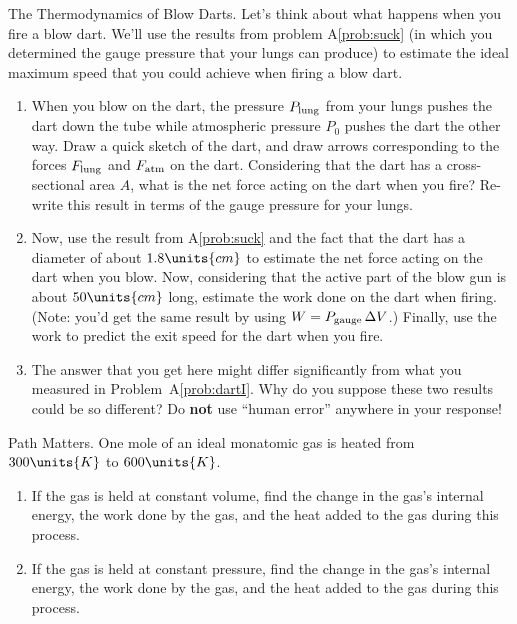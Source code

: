 \begin{aproblem}{The Thermodynamics of Blow Darts.}  
  Let's think about what happens when you fire a blow dart.  We'll use
  the results from problem A\ref{prob:suck} (in which you determined
  the gauge pressure that your lungs can produce) to estimate the
  ideal maximum speed that you could achieve when firing a blow dart.

  \begin{enumerate}

  \item When you blow on the dart, the pressure $P_{\rm lung}$ from
    your lungs pushes the dart down the tube while atmospheric
    pressure $P_0$ pushes the dart the other way.  Draw a quick sketch
    of the dart, and draw arrows corresponding to the forces $F_{\rm
      lung}$ and $F_{\rm atm}$ on the dart.  Considering that the dart
    has a cross-sectional area $A$, what is the net force acting on
    the dart when you fire?  Re-write this result in terms of the
    gauge pressure for your lungs.

  \item Now, use the result from A\ref{prob:suck} and the fact that
    the dart has a diameter of about $1.8\units{cm}$ to estimate the
    net force acting on the dart when you blow.  Now, considering that
    the active part of the blow gun is about $50\units{cm}$ long,
    estimate the work done on the dart when firing.  (Note: you'd get
    the same result by using $W = P_{\rm gauge}\, \Delta V$.)
    Finally, use the work to predict the exit speed for the dart when
    you fire.

  \item The answer that you get here might differ significantly from
    what you measured in Problem~A\ref{prob:dartI}.  Why do you
    suppose these two results could be so different?  Do {\bf not} use
    ``human error'' anywhere in your response!
  \end{enumerate}
\end{aproblem}

\begin{aproblem}{Path Matters.} 
  One mole of an ideal monatomic gas is heated from $300\units{K}$
  to $600\units{K}$.
  \begin{enumerate}
  \item If the gas is held at constant volume, find the change in the
    gas's internal energy, the work done by the gas, and the heat
    added to the gas during this process.

  \item If the gas is held at constant pressure, find the change in
    the gas's internal energy, the work done by the gas, and the heat
    added to the gas during this process.
  \end{enumerate}
\end{aproblem}


